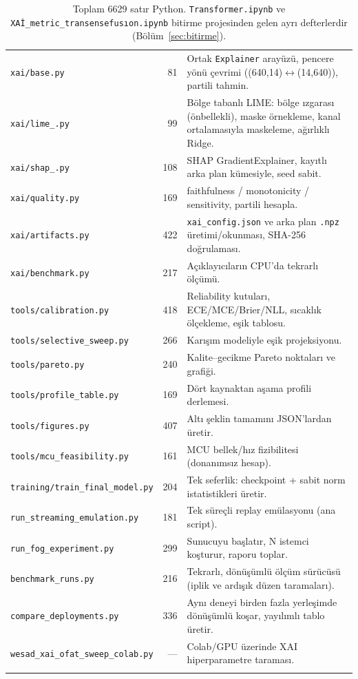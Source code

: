 \documentclass[11pt,a4paper]{report}
\newcommand{\kod}[1]{\texttt{\small #1}}
\newcommand{\dosya}[1]{\texttt{\footnotesize #1}}
\begin{document}
\begin{longtable}{@{}p{4.6cm}rp{9.3cm}@{}}
\dosya{xai/base.py} & 81 & Ortak \kod{Explainer} arayüzü, pencere yönü çevrimi ((640,14)$\leftrightarrow$(14,640)), partili tahmin. \\
\dosya{xai/lime\_.py} & 99 & Bölge tabanlı LIME: bölge ızgarası (önbellekli), maske örnekleme, kanal ortalamasıyla maskeleme, ağırlıklı Ridge. \\
\dosya{xai/shap\_.py} & 108 & SHAP GradientExplainer, kayıtlı arka plan kümesiyle, seed sabit. \\
\dosya{xai/quality.py} & 169 & faithfulness / monotonicity / sensitivity, partili hesapla. \\
\dosya{xai/artifacts.py} & 422 & \kod{xai\_config.json} ve arka plan \kod{.npz} üretimi/okunması, SHA-256 doğrulaması. \\
\dosya{xai/benchmark.py} & 217 & Açıklayıcıların CPU'da tekrarlı ölçümü. \\
\dosya{tools/calibration.py} & 418 & Reliability kutuları, ECE/MCE/Brier/NLL, sıcaklık ölçekleme, eşik tablosu. \\
\dosya{tools/selective\_sweep.py} & 266 & Karışım modeliyle eşik projeksiyonu. \\
\dosya{tools/pareto.py} & 240 & Kalite--gecikme Pareto noktaları ve grafiği. \\
\dosya{tools/profile\_table.py} & 169 & Dört kaynaktan aşama profili derlemesi. \\
\dosya{tools/figures.py} & 407 & Altı şeklin tamamını JSON'lardan üretir. \\
\dosya{tools/mcu\_feasibility.py} & 161 & MCU bellek/hız fizibilitesi (donanımsız hesap). \\
\dosya{training/train\_final\_model.py} & 204 & Tek seferlik: checkpoint + sabit norm istatistikleri üretir. \\
\dosya{run\_streaming\_emulation.py} & 181 & Tek süreçli replay emülasyonu (ana script). \\
\dosya{run\_fog\_experiment.py} & 299 & Sunucuyu başlatır, N istemci koşturur, raporu toplar. \\
\dosya{benchmark\_runs.py} & 216 & Tekrarlı, dönüşümlü ölçüm sürücüsü (iplik ve ardışık düzen taramaları). \\
\dosya{compare\_deployments.py} & 336 & Aynı deneyi birden fazla yerleşimde dönüşümlü koşar, yayılımlı tablo üretir. \\
\dosya{wesad\_xai\_ofat\_sweep\_colab.py} & --- & Colab/GPU üzerinde XAI hiperparametre taraması. \\
\bottomrule
\caption{Toplam 6629 satır Python. \dosya{Transformer.ipynb} ve
\dosya{XAİ\_metric\_transensefusıon.ipynb} bitirme projesinden gelen ayrı
defterlerdir (Bölüm~\ref{sec:bitirme}).}
\end{longtable}
\end{document}

